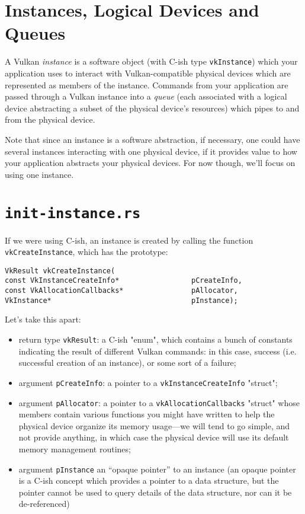 \documentclass[12pt,letterpaper]{article}
\newcommand{\inquotes}[1]{``#1''}	%
\newcommand{\cil}[1]{\texttt{#1}}
\begin{document}
\section{Instances, Logical Devices and Queues}

A Vulkan \emph{instance} is a software object (with C-ish type \cil{vkInstance}) which your application uses to interact with Vulkan-compatible physical devices which are represented as members of the instance. Commands from your application are passed through a Vulkan instance into a \emph{queue} (each associated with a logical device abstracting a subset of the physical device's resources) which pipes to and from the physical device. 

Note that since an instance is a software abstraction, if necessary, one could have several instances interacting with one physical device, if it provides value to how your application abstracts your physical devices. For now though, we'll focus on using one instance.
	
\section{\texttt{init-instance.rs}}
	
	If we were using C-ish, an instance is created by calling the function \cil{vkCreateInstance}, which has the prototype:
		\begin{verbatim}
VkResult vkCreateInstance(
const VkInstanceCreateInfo*                 pCreateInfo,
const VkAllocationCallbacks*                pAllocator,
VkInstance*                                 pInstance);
		\end{verbatim}
		
	Let's take this apart:
		\begin{itemize}
			\item return type \cil{vkResult}: a C-ish "enum", which contains a bunch of  constants indicating the result of different Vulkan commands: in this case, success (i.e. successful creation of an instance), or some sort of a failure;
			
			\item argument \cil{pCreateInfo}: a pointer to a \cil{vkInstanceCreateInfo} "struct";
			
			\item argument \cil{pAllocator}: a pointer to a \cil{vkAllocationCallbacks} "struct" whose members contain various functions you might have written to help the physical device organize its memory usage---we will tend to go simple, and not provide anything, in which case the physical device will use its default memory management routines;
			
			\item argument \cil{pInstance} an \inquotes{opaque pointer} to an instance (an opaque pointer is a C-ish concept which provides a pointer to a data structure, but the pointer cannot be used to query details of the data structure, nor can it be de-referenced)
		\end{itemize}
	
\end{document}

